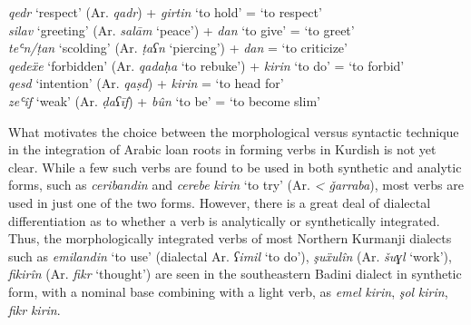 \documentclass[output=paper]{langsci/langscibook}
\begin{document}
\ea\label{compound}
\textit{qedr} ‘respect’              (Ar. \textit{qadr})                +   \textit{girtin} ‘to hold’    =  ‘to respect’     \\
\textit{silav} ‘greeting’            (Ar. \textit{salām} ‘peace’)       +   \textit{dan} ‘to give’       =   ‘to greet’      \\
\textit{teʿn\slash ṭan} ‘scolding’   (Ar. \textit{ṭaʕn} ‘piercing’)     + \textit{dan}                   =   ‘to criticize’  \\
\textit{qedeẍe} ‘forbidden’          (Ar. \textit{qadaḥa} ‘to rebuke’)  +   \textit{kirin} ‘to do’       =   ‘to forbid’     \\
\textit{qesd} ‘intention’            (Ar. \textit{qaṣd})                +   \textit{kirin}               =   ‘to head for’   \\
\textit{zeʿîf} ‘weak’                (Ar. \textit{ḍaʕīf})               +   \textit{bûn} ‘to be’         =   ‘to become slim’
\z

What motivates the choice between the morphological versus syntactic technique in the integration of Arabic loan roots in forming verbs in Kurdish is not yet clear. While a few such verbs are found to be used in both synthetic and analytic forms, such as \textit{ceribandin} and \textit{cerebe} \textit{kirin} ‘to try’ (Ar. \textit{< ǧarraba}), most verbs are used in just one of the two forms. However, there is a great deal of dialectal differentiation as to whether a verb is analytically or synthetically integrated. Thus, the morphologically integrated verbs of most Northern Kurmanji dialects such as \textit{emilandin} ‘to use’ (dialectal Ar. \textit{ʕimil} ‘to do’), \textit{şuẍulîn} (Ar. \textit{šuɣl} ‘work’), \textit{fikirîn} (Ar. \textit{fikr} ‘thought’) are seen in the southeastern Badini dialect in synthetic form, with a nominal base combining with a light verb, as \textit{emel} \textit{kirin}, \textit{şol} \textit{kirin}, \textit{fikr} \textit{kirin}.   
\end{document}
